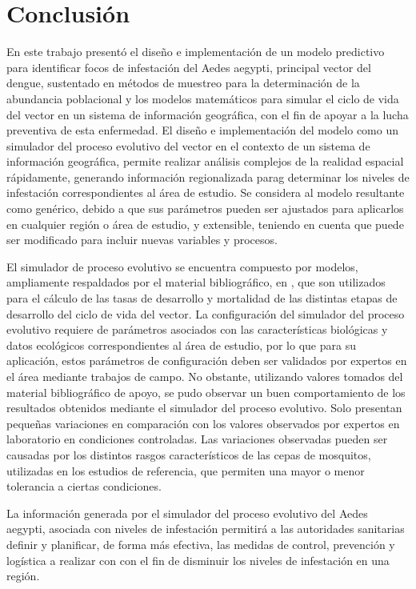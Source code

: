 \section{Conclusión}
En este trabajo presentó el diseño e implementación de un modelo predictivo para identificar focos
de infestación del Aedes aegypti, principal vector del dengue, sustentado en métodos de muestreo
para la determinación de la abundancia poblacional y los modelos matemáticos para simular el ciclo
de vida del vector en un sistema de información geográfica, con el fin de apoyar a la lucha
preventiva de esta enfermedad. El diseño e implementación del modelo como un simulador del proceso
evolutivo del vector en el contexto de un sistema de información geográfica, permite realizar
análisis complejos de la realidad espacial rápidamente, generando información regionalizada parag
determinar los niveles de infestación correspondientes al área de estudio. Se considera al modelo
resultante como genérico, debido a que sus parámetros pueden ser ajustados para aplicarlos en
cualquier región o área de estudio, y extensible, teniendo en cuenta que puede ser modificado para
incluir nuevas variables y procesos.

El simulador de proceso evolutivo se encuentra compuesto por modelos, ampliamente respaldados por
el material bibliográfico, en \cite{sharpe1977reaction, focks1993dynamic, schoolfield1981non, otero2006stochastic, rueda1990temperature}, que son utilizados para el cálculo de las tasas de
desarrollo y mortalidad de las distintas etapas de desarrollo del ciclo de vida del vector. La
configuración del simulador del proceso evolutivo requiere de parámetros asociados con las
características biológicas y datos ecológicos correspondientes al área de estudio, por lo que para
su aplicación, estos parámetros de configuración deben ser validados por expertos en el área
mediante trabajos de campo. No obstante, utilizando valores tomados del material bibliográfico de
apoyo, se pudo observar un buen comportamiento de los resultados obtenidos mediante el simulador
del proceso evolutivo. Solo presentan pequeñas variaciones en comparación con los valores
observados por expertos en laboratorio en condiciones controladas. Las variaciones observadas
pueden ser causadas por los distintos rasgos característicos de las cepas de mosquitos, utilizadas
en los estudios de referencia, que permiten una mayor o menor tolerancia a ciertas condiciones.

La información generada por el simulador del proceso evolutivo del Aedes aegypti, asociada con
niveles de infestación permitirá a las autoridades sanitarias definir y planificar, de forma más
efectiva, las medidas de control, prevención y logística a realizar con con el fin de disminuir
los niveles de infestación en una región.

